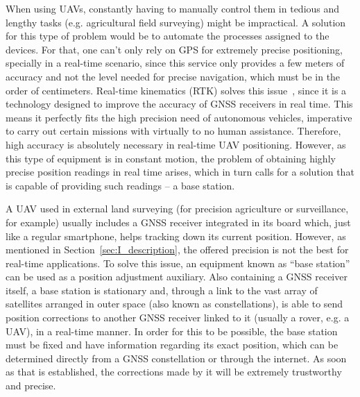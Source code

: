 When using UAVs, constantly having to manually control them in tedious and lengthy tasks (e.g. agricultural field surveying) might be impractical.
A solution for this type of problem would be to automate the processes assigned to the devices. For that, one can't only rely on GPS for extremely precise positioning, specially in a real-time scenario, since this service only provides a few meters of accuracy and not the level needed for precise navigation, which must be in the order of centimeters. Real-time kinematics (RTK) solves this issue~\cite{gps_USGov,8714161},
since it is a technology designed to improve the accuracy of GNSS receivers in real time. This means it perfectly fits the high precision need of autonomous vehicles, imperative to carry out certain missions with virtually to no human assistance. Therefore, high accuracy is absolutely necessary in real-time UAV positioning.
However, as this type of equipment is in constant motion, the problem of obtaining highly precise position readings in real time arises, which in turn calls for a solution that is capable of providing such readings -- a base station.

A UAV used in external land surveying (for precision agriculture or surveillance, for example) usually includes a GNSS receiver integrated in its board which, just like a regular smartphone, helps tracking down its current position.
However, as mentioned in Section~\ref{sec:I_description}, the offered precision is not the best for real-time applications.
To solve this issue, an equipment known as ``base station'' can be used as a position adjustment auxiliary.
Also containing a GNSS receiver itself, a base station is stationary and, through a link to the vast array of satellites arranged in outer space (also known as constellations), is able to send position corrections to another GNSS receiver linked to it (usually a rover, e.g. a UAV), in a real-time manner.
In order for this to be possible, the base station must be fixed and have information regarding its exact position, which can be determined directly from a GNSS constellation or through the internet.
As soon as that is established, the corrections made by it will be extremely trustworthy and precise.

